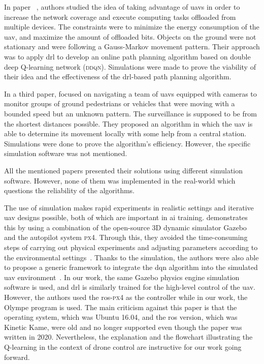 \documentclass[../main.tex]{subfiles}
\begin{document}
	
	In paper ~\cite{pen21}, authors \citeauthor{pen21} studied the idea 
	of taking advantage of \glspl{uav} in order to increase the network
	coverage and execute computing tasks offloaded from multiple devices. 
	The constraints were to minimize the energy consumption of the \gls{uav}, 
	and maximize the amount of offloaded bits. 
	Objects on the ground were not stationary and were following a Gauss-Markov 
	movement pattern. Their approach was to apply \gls{drl} to develop an online path planning algorithm based on double deep Q-learning network (\textsc{ddqn}).
	Simulations were made to prove the viability of their idea and the 
	effectiveness of the \gls{drl}-based path planning algorithm.
	
	In a third paper, \citeauthor{hua21} focused on navigating a team
	of \glspl{uav} equipped with cameras to monitor groups of ground 
	pedestrians or vehicles that were moving with a bounded speed but an unknown pattern. 
	The surveillance is supposed to be from the shortest distances possible. 
	They proposed an algorithm in which the \gls{uav} is able to determine 
	its movement locally with some help from a central station.
	Simulations were done to prove the algorithm's efficiency. However, the 
	specific simulation software was not mentioned. 
	
	All the mentioned papers presented their solutions using different 
	simulation software. However, none of them was implemented in the real-world which questions the reliability of the algorithms.
	
	
	The use of simulation makes rapid experiments in realistic settings 
	and iterative \gls{uav} designs possible, 
	both of which are important in \gls{ai} training. 
	\citeauthor{Zho20} demonstrates this by %
	using a combination of the open-source 3D dynamic simulator Gazebo
	and the autopilot system \textsc{px}4.
	Through this, they avoided the time-consuming steps of 
	carrying out physical experiments
	and adjusting parameters according 
	to the environmental settings~\cite{Zho20}.
	Thanks to the simulation, 
	the authors were also able to propose a generic
	framework to integrate the \gls{dqn} algorithm into 
	the simulated \gls{uav} environment~\cite{Zho20}.
	In our work, the same Gazebo physics engine
	simulation software is used, and \gls{drl} is similarly trained
	for the high-level control of the \gls{uav}. 
	However, the authors used the \gls{ros}-\textsc{px}4 as the controller 
	while in our work, the Olympe program is used.
	The main criticism against this paper is that the operating system,
	which was Ubuntu 16.04, and 
	the \gls{ros} version, which was Kinetic Kame, 
	were old and no longer supported 
	even though the paper was written in 2020.
	Nevertheless, the explanation and the flowchart illustrating the 
	Q-learning in the context of drone control are instructive 
	for our work going forward.
	
\end{document}
